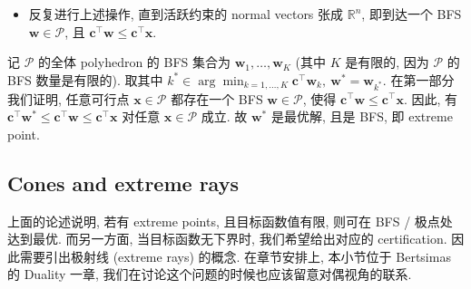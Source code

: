 \begin{thmblock}
\begin{proof*}[{Proof}]
\begin{itemize}
\begin{itemize}
\item {}若 $\bm{c}^\top \bm{d} < 0$. 则此时对于移动后的点的目标值 $\bm{c}^\top \bm{y} = \bm{c}^\top \bm{x} + \lambda \bm{c}^\top \bm{d} < \bm{c}^\top \bm{x}$ 是严格下降的. 故断言沿此方向定会最终遇到新的约束边界点, 否则当 $\lambda \to +\infty$ 时, $\bm{c}^\top \bm{y} \to -\infty$, 与目标函数有下界矛盾. 与前文论述相同, 在新的边界点, 其活跃约束的 normal vectors 张成的空间维度至少增加 $1$.


\item {}若 $\bm{c}^\top \bm{d} = 0$. 则此时沿着 $\bm{d}$ 的方向移动, 目标函数值不变. 可选择 $\bm{d}$ 或 $-\bm{d}$ 中受阻的一侧平移直到遇到新的约束边界点, 其活跃约束的 normal vectors 张成的空间维度至少增加 $1$.


\end{itemize}


\item {}反复进行上述操作, 直到活跃约束的 normal vectors 张成 $\mathbb{R}^n$, 即到达一个 BFS $\bm{w} \in \mathcal{P}$, 且 $\bm{c}^\top \bm{w} \leq \bm{c}^\top \bm{x}$.


\end{itemize}

记 $\mathcal{P}$ 的全体 polyhedron 的 BFS 集合为 $\bm{w}_1, \dots, \bm{w}_K$ (其中 $K$ 是有限的, 因为 $\mathcal{P}$ 的 BFS 数量是有限的). 取其中 $k^* \in \arg\min_{k=1,\dots,K} \bm{c}^\top \bm{w}_k,~ \bm{w}^* = \bm{w}_{k^*}$. 在第一部分我们证明, 任意可行点 $\bm{x} \in \mathcal{P}$ 都存在一个 BFS $\bm{w} \in \mathcal{P}$, 使得 $\bm{c}^\top \bm{w} \leq \bm{c}^\top \bm{x}$. 因此, 有 $\bm{c}^\top \bm{w}^* \leq \bm{c}^\top \bm{w} \leq \bm{c}^\top \bm{x}$ 对任意 $\bm{x} \in \mathcal{P}$ 成立. 故 $\bm{w}^*$ 是最优解, 且是 BFS, 即 extreme point.

\end{proof*}

\end{thmblock}

\subsection{Cones and extreme rays}

上面的论述说明, 若有 extreme points, 且目标函数值有限, 则可在 BFS / 极点处达到最优. 而另一方面, 当目标函数无下界时, 我们希望给出对应的 certification. 因此需要引出极射线 (extreme rays) 的概念. 在章节安排上, 本小节位于 Bertsimas 的 Duality 一章, 我们在讨论这个问题的时候也应该留意对偶视角的联系.


